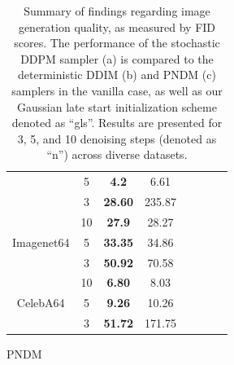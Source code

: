 \documentclass{article}
\begin{document}
\begin{table}
\begin{subtable}[t]{0.336\textwidth}
{\begin{tabular}{cccccccc}
        & 5 &\textbf{4.2} &6.61  \\
        & 3 &\textbf{28.60} &235.87 \\
        \midrule
        \multirow{3}{*}{Imagenet64} & 10 &\textbf{27.9} &28.27 \\
        & 5  &\textbf{33.35} &34.86 \\
        & 3  &\textbf{50.92} &70.58  \\
        \midrule
        \multirow{3}{*}{CelebA64} & 10 &\textbf{6.80} &8.03 \\
        & 5 &\textbf{9.26} &10.26    \\
        & 3 &\textbf{51.72}  &171.75 \\
        \hline
        \bottomrule
        \end{tabular}
    }
    \caption{PNDM}
    \label{tab:results_pndm}
    \end{subtable}
    \caption{Summary of findings regarding image generation quality, as measured by FID scores. The performance of the stochastic DDPM sampler (a) is compared to the deterministic DDIM (b) and PNDM (c) samplers in the vanilla case, as well as our Gaussian late start initialization scheme denoted as ``gls''. Results are presented for 3, 5, and 10 denoising steps (denoted as ``n'') across diverse datasets.}
    \label{tab:results}
\end{table}
\end{document}
